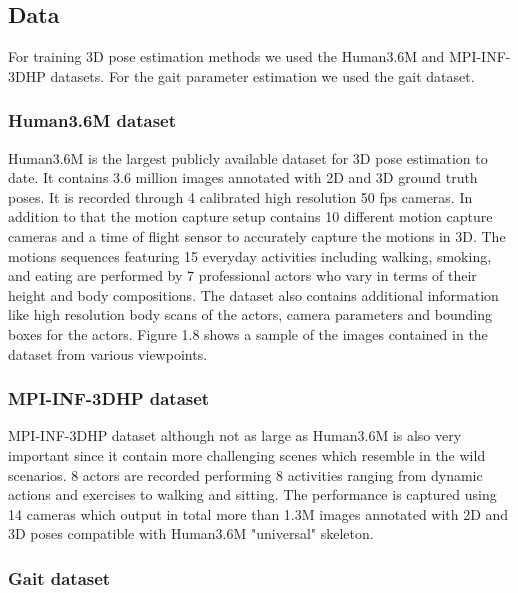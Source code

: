 \subsection{Data}

For training 3D pose estimation methods we used the Human3.6M \parencite{ionescu2014human3} and MPI-INF-3DHP \parencite{mehta2017monocular} datasets. For the gait parameter estimation we used the gait dataset.

\subsubsection{Human3.6M dataset}

Human3.6M is the largest publicly available dataset for 3D pose estimation to date. It contains 3.6 million images annotated with 2D and 3D ground truth poses. It is recorded through 4 calibrated high resolution 50 fps cameras. In addition to that the motion capture setup contains 10 different motion capture cameras and a time of flight sensor to accurately capture the motions in 3D. The motions sequences featuring 15 everyday activities including walking, smoking, and eating are performed by 7 professional actors who vary in terms of their height and body compositions. The dataset also contains additional information like high resolution body scans of the actors, camera parameters and bounding boxes for the actors. Figure 1.8 shows a sample of the images contained in the dataset from various viewpoints.

\subsubsection{MPI-INF-3DHP dataset}

MPI-INF-3DHP dataset although not as large as Human3.6M is also very important since it contain more challenging scenes which resemble in the wild scenarios. 8 actors are recorded performing 8 activities ranging from dynamic actions and exercises to walking and sitting. The performance is captured using 14 cameras which output in total more than 1.3M images annotated with 2D and 3D poses compatible with Human3.6M "universal" skeleton.

\subsubsection{Gait dataset}

